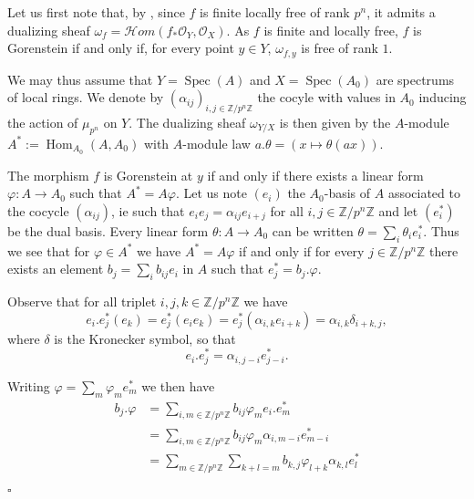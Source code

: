 \documentclass{amsart}
\newenvironment{demo}{{\flushleft \bf Proof~:}}{\hfill $\square$ \vspace{5mm}}
\theoremstyle{definition}
\theoremstyle{remark}
\begin{document}
\begin{demo}

Let us first note that, by \label{dual}, since $f$ is finite locally free of rank $p^n$, it admits a dualizing sheaf $\omega_f = {{\mathcal H}} om(f_*{{\mathcal O}}_Y,{{\mathcal O}}_X)$. As $f$ is finite and locally free, $f$ is Gorenstein if and only if, for every point $y \in Y$, $\omega_{f,y}$ is free of rank $1$. 

We may thus assume that $Y=\operatorname{Spec}(A)$ and $X = \operatorname{Spec}(A_0)$ are spectrums of local rings. We denote by $(\alpha_{ij})_{i,j \in {\mathbb{Z}} / p^n {\mathbb{Z}}}$ the cocyle with values in $A_0$ inducing the action of $\mu_{p^n}$ on $Y$. The dualizing sheaf $\omega_{Y/X}$ is then given by the $A$-module $A^*:=\operatorname{Hom}_{A_0}(A,A_0)$ with $A$-module law $a.\theta = (x \mapsto \theta(ax))$.  

The morphism $f$ is Gorenstein at $y$ if and only if there exists a linear form $\varphi : A {\longrightarrow} A_0$ such that $A^*= A \varphi$. Let us note $(e_i)$ the $A_0$-basis of $A$ associated to the cocycle $(\alpha_{ij})$, ie such that $e_i e_j = \alpha_{ij} e_{i+j}$ for all $i,j \in {\mathbb{Z}} / p^n {\mathbb{Z}}$ and let $(e_i^*)$ be the dual basis. Every linear form $\theta : A {\longrightarrow} A_0$ can be written $\theta = \sum_i \theta_i e_i^*$. Thus we see that for $\varphi \in A^*$ we have $A^* = A \varphi$ if and only if for every $j \in {\mathbb{Z}}/p^n{\mathbb{Z}}$ there exists an element $b_j = \sum_i b_{ij}e_i$ in $A$ such that $e_j^* = b_j. \varphi$. 

Observe that for all triplet $i,j,k \in {\mathbb{Z}}/ p^n {\mathbb{Z}}$ we have \[ e_i . e_j^*(e_k) = e_j^*(e_i e_k) = e_j^*(\alpha_{i,k} e_{i+k}) = \alpha_{i,k} \delta_{i+k,j}, \] where $\delta$ is the Kronecker symbol, so that \[ e_i . e_j^* = \alpha_{i,j-i}e_{j-i}^*. \]

Writing $\varphi = \sum_m \varphi_m e_m^*$ we then have \begin{equation*} \label{}
\begin{split}
b_j. \varphi & = \displaystyle\sum_{i,m \in {\mathbb{Z}} / p^n {\mathbb{Z}}}b_{ij}  \varphi_m e_i.e_m^* \\
& = \displaystyle\sum_{i,m \in {\mathbb{Z}} / p^n {\mathbb{Z}}} b_{ij} \varphi_m \alpha_{i,m-i} e_{m-i}^ *   \\
& = \displaystyle\sum_{m \in {\mathbb{Z}}/ p^n {\mathbb{Z}}} \displaystyle\sum_{k+l = m} b_{k,j} \varphi_{l+k} \alpha_{k,l} e_l^*
\end{split} 
\end{equation*}   


\end{demo}
\end{document}
